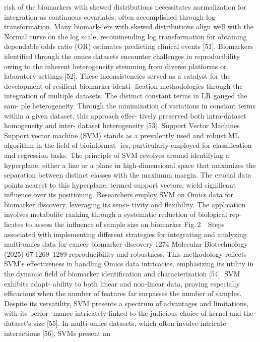 risk of the biomarkers with skewed distributions necessitates
normalization for integration as continuous covariates, often
accomplished through log transformation. Many biomark-
ers with skewed distributions align well with the Normal
curve on the log scale, recommending log transformation for
obtaining dependable odds ratio (OR) estimates predicting
clinical events [51]. Biomarkers identified through the omics
datasets encounter challenges in reproducibility owing to the
inherent heterogeneity stemming from diverse platforms or
laboratory settings [52]. These inconsistencies served as a
catalyst for the development of resilient biomarker identi-
fication methodologies through the integration of multiple
datasets. The distinct constant terms in LR gauged the sam-
ple heterogeneity. Through the minimization of variations in
constant terms within a given dataset, this approach effec-
tively preserved both intra-dataset homogeneity and inter-
dataset heterogeneity [53].
Support Vector Machines
Support vector machine (SVM) stands as a prevalently
used and robust ML algorithm in the field of bioinformat-
ics, particularly employed for classification and regression
tasks. The principle of SVM revolves around identifying
a hyperplane, either a line or a plane in high-dimensional
space that maximizes the separation between distinct classes
with the maximum margin. The crucial data points nearest
to this hyperplane, termed support vectors, wield significant
influence over its positioning. Researchers employ SVM on
Omics data for biomarker discovery, leveraging its sensi-
tivity and flexibility. The application involves metabolite
ranking through a systematic reduction of biological rep-
licates to assess the influence of sample size on biomarker
Fig. 2   Steps associated with implementing different strategies for integrating and analyzing multi-omics data for cancer biomarker discovery
1274
Molecular Biotechnology (2025) 67:1269–1289
reproducibility and robustness. This methodology reflects
SVM’s effectiveness in handling Omics data intricacies,
emphasizing its utility in the dynamic field of biomarker
identification and characterization [54]. SVM exhibits adapt-
ability to both linear and non-linear data, proving especially
efficacious when the number of features far surpasses the
number of samples. Despite its versatility, SVM presents
a spectrum of advantages and limitations, with its perfor-
mance intricately linked to the judicious choice of kernel
and the dataset’s size [55]. In multi-omics datasets, which
often involve intricate interactions [56], SVMs present an
